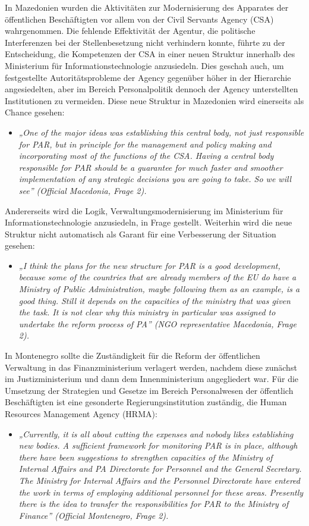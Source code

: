 In Mazedonien wurden die Aktivitäten zur Modernisierung des Apparates der öffentlichen Beschäftigten vor allem von der Civil Servants Agency (CSA) wahrgenommen. Die fehlende Effektivität der Agentur, die politische Interferenzen bei der Stellenbesetzung nicht verhindern konnte, führte zu der Entscheidung, die Kompetenzen der CSA in einer neuen Struktur innerhalb des Ministerium für Informationstechnologie anzusiedeln. Dies geschah auch, um festgestellte Autoritätsprobleme der Agency gegenüber höher in der Hierarchie angesiedelten, aber im Bereich Personalpolitik dennoch der Agency unterstellten Institutionen zu vermeiden. Diese neue Struktur in Mazedonien wird einerseits als Chance gesehen:
\begin{itemize}[label={}]
\item \textit{„One of the major ideas was establishing this central body, not just responsible for PAR, but in principle for the management and policy making and incorporating most of the functions of the CSA. Having a central body responsible for PAR should be a guarantee for much faster and smoother implementation of any strategic decisions you are going to take. So we will see” (Official Macedonia, Frage 2).}
\end{itemize}
Andererseits wird die Logik, Verwaltungsmodernisierung im Ministerium für Informationstechnologie anzusiedeln, in Frage gestellt. Weiterhin wird die neue Struktur nicht automatisch als Garant für eine Verbesserung der Situation gesehen:
\begin{itemize}[label={}]
\item \textit{„I think the plans for the new structure for PAR is a good development, because some of the countries that are already members of the EU do have a Ministry of Public Administration, maybe following them as an example, is a good thing. Still it depends on the capacities of the ministry that was given the task. It is not clear why this ministry in particular was assigned to undertake the reform process of PA” (NGO representative Macedonia, Frage 2).}
\end{itemize}
In Montenegro sollte die Zuständigkeit für die Reform der öffentlichen Verwaltung in das Finanzministerium verlagert werden, nachdem diese zunächst im Justizministerium und dann dem Innenministerium angegliedert war. Für die Umsetzung der Strategien und Gesetze im Bereich Personalwesen der öffentlich Beschäftigten ist eine gesonderte Regierungsinstitution zuständig, die Human Resources Management Agency (HRMA):
\begin{itemize}[label={}]
\item \textit{„Currently, it is all about cutting the expenses and nobody likes establishing new bodies. A sufficient framework for monitoring PAR is in place, although there have been suggestions to strengthen capacities of the Ministry of Internal Affairs and PA Directorate for Personnel and the General Secretary. The Ministry for Internal Affairs and the Personnel Directorate have entered the work in terms of employing additional personnel for these areas. Presently there is the idea to transfer the responsibilities for PAR to the Ministry of Finance” (Official Montenegro, Frage 2).}
\end{itemize}
